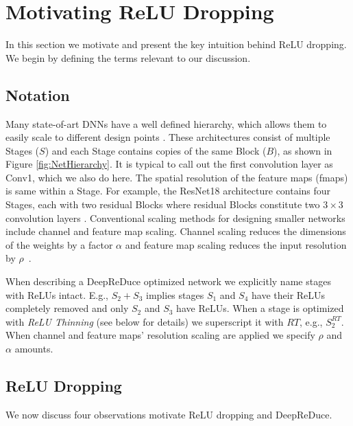

\section{Motivating ReLU Dropping} \label{sec:Motivation}

In this section we motivate and present the key intuition behind ReLU dropping.  
We begin by defining the terms relevant to our discussion.



\subsection{Notation}
Many state-of-art DNNs have a well defined hierarchy, 
which allows them to easily scale to different design points \cite{he2016deep,zagoruyko2016wide,xie2017aggregated,huang2017densely,huang2018condensenet,brendel2018approximating,sandler2018mobilenetv2}. 
These architectures consist of multiple Stages ($S$)
and each Stage contains copies of the same Block ($B$), as shown in Figure \ref{fig:NetHierarchy}. 
It is typical to call out the first convolution layer as Conv1, which we also do here.
The spatial resolution of the feature maps (fmaps) is same within a Stage. 
For example, the ResNet18 architecture contains four Stages, 
each with two residual Blocks where residual Blocks constitute
two $3\times3$ convolution layers \cite{he2016deep}.
Conventional scaling methods for designing smaller networks include 
channel and feature map scaling.
Channel scaling reduces the dimensions of the weights by a factor $\alpha$
and feature map scaling reduces the input resolution by $\rho$~\cite{howard2017mobilenets,tan2019efficientnet}.

When describing a DeepReDuce optimized network we explicitly name stages with ReLUs intact.
E.g., $S_{2} + S_{3}$ implies stages $S_1$ and $S_4$ have their ReLUs completely removed and
only $S_2$ and $S_3$ have ReLUs.
When a stage is optimized with \textit{ReLU Thinning} (see below for details)
we superscript it with $RT$, e.g., $S_2^{RT}$.
When channel and feature maps' resolution scaling are applied we specify $\rho$ and $\alpha$ amounts.
 

\subsection{ReLU Dropping}
We now discuss four observations motivate ReLU dropping and DeepReDuce.

